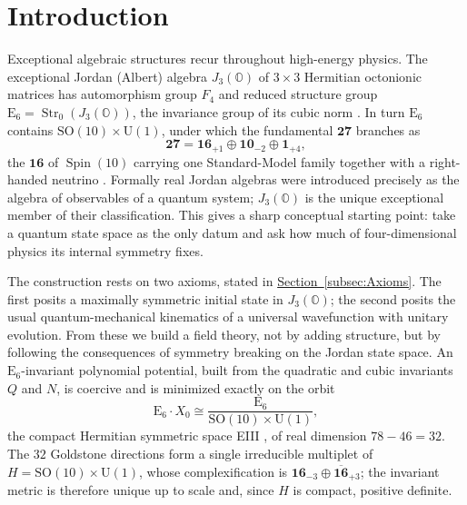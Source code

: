 \documentclass[pdflatex,sn-mathphys-num]{sn-jnl}
\theoremstyle{thmstyleone}
\theoremstyle{thmstyletwo}%
\theoremstyle{thmstylethree}%
\newcommand{\SO}[1]{\mathrm{SO(#1)}}
\newcommand{\U}[1]{\mathrm{U(#1)}}
\newcommand{\E}[1]{\mathrm{E_{#1}}}
\newcommand{\jalg}{J_3(\mathbb{O})}
\newcommand{\SOTen}{\SO{10}}
\newcommand{\UOne}{\U{1}}
\newcommand{\ESix}{\E{6}}
\newcommand{\SOTenXUOne}{\SOTen \times \UOne}
\newcommand{\MCoset}{\frac{\ESix}{\SOTenXUOne}}
\newcommand{\Str}{\operatorname{Str}}
\newcommand{\Spin}{\operatorname{Spin}}
\newcommand{\subsecref}[1]{\hyperref[#1]{Section~\ref*{#1}}}
\begin{document}



\maketitle

\section{Introduction}

Exceptional algebraic structures recur throughout high-energy physics. The
exceptional Jordan (Albert) algebra $\jalg$ of $3\times3$ Hermitian octonionic
matrices has automorphism group $F_{4}$ and reduced structure group
$\ESix=\Str_{0}(\jalg)$, the invariance group of its cubic norm
\cite{Jacobson:1968,Springer:2000,McCrimmon:2004}. In turn $\ESix$ contains
$\SOTenXUOne$, under which the fundamental $\mathbf{27}$ branches as
\[
  \mathbf{27}=\mathbf{16}_{+1}\oplus\mathbf{10}_{-2}\oplus\mathbf{1}_{+4},
\]
the $\mathbf{16}$ of $\Spin(10)$ carrying one Standard-Model family together
with a right-handed neutrino \cite{Slansky:1981}. Formally real Jordan algebras
were introduced precisely as the algebra of observables of a quantum system;
$\jalg$ is the unique exceptional member of their classification. This gives a
sharp conceptual starting point: take a quantum state space as the only datum
and ask how much of four-dimensional physics its internal symmetry fixes.

The construction rests on two axioms, stated in
\subsecref{subsec:Axioms}. The first posits a maximally symmetric initial state
in $\jalg$; the second posits the usual quantum-mechanical kinematics of a
universal wavefunction with unitary evolution. From these we build a field
theory, not by adding structure, but by following the consequences of
symmetry breaking on the Jordan state space. An $\ESix$-invariant polynomial
potential, built from the quadratic and cubic invariants $Q$ and $N$, is
coercive and is minimized exactly on the orbit
\[
  \ESix\cdot X_{0}\cong\MCoset,
\]
the compact Hermitian symmetric space EIII \cite{Helgason:1978}, of real
dimension $78-46=32$. The $32$ Goldstone directions form a single irreducible
multiplet of $H=\SOTenXUOne$, whose complexification is
$\mathbf{16}_{-3}\oplus\overline{\mathbf{16}}_{+3}$; the invariant metric is
therefore unique up to scale and, since $H$ is compact, positive definite.
\end{document}
